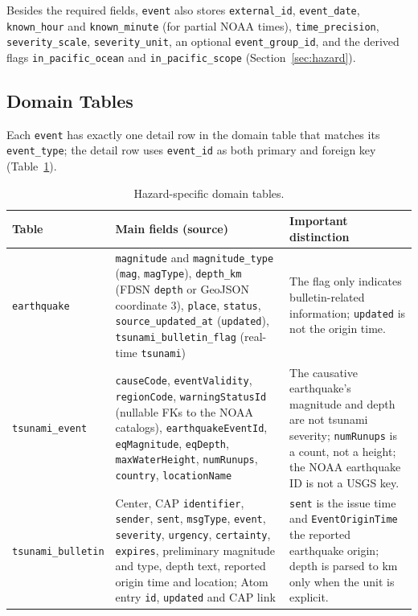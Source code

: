 \documentclass[a4paper,11pt,oneside]{book}
\begin{document}
Besides the required fields, \texttt{event} also stores \texttt{external\_id}, \texttt{event\_date}, \texttt{known\_hour} and \texttt{known\_minute} (for partial NOAA times), \texttt{time\_precision}, \texttt{severity\_scale}, \texttt{severity\_unit}, an optional \texttt{event\_group\_id}, and the derived flags \texttt{in\_pacific\_ocean} and \texttt{in\_pacific\_scope} (Section~\ref{sec:hazard}).

\subsection{Domain Tables}
Each \texttt{event} has exactly one detail row in the domain table that matches its \texttt{event\_type}; the detail row uses \texttt{event\_id} as both primary and foreign key (Table~\ref{tab:domain}).

\begin{table}[H]
\centering
\footnotesize
\begin{tabularx}{\textwidth}{@{}>{\raggedright\arraybackslash}p{2.7cm}>{\raggedright\arraybackslash}X>{\raggedright\arraybackslash}p{4.4cm}@{}}
\toprule
Table & Main fields (source) & Important distinction \\
\midrule
\texttt{earthquake} & \texttt{magnitude} and \texttt{magnitude\_type} (\texttt{mag}, \texttt{magType}), \texttt{depth\_km} (FDSN \texttt{depth} or GeoJSON coordinate 3), \texttt{place}, \texttt{status}, \texttt{source\_updated\_\allowbreak at} (\texttt{updated}), \texttt{tsunami\_bulletin\_\allowbreak flag} (real-time \texttt{tsunami}) & The flag only indicates bulletin-related information; \texttt{updated} is not the origin time. \\
\texttt{tsunami\_event} & \texttt{causeCode}, \texttt{eventValidity}, \texttt{regionCode}, \texttt{warningStatusId} (nullable FKs to the NOAA catalogs), \texttt{earthquakeEventId}, \texttt{eqMagnitude}, \texttt{eqDepth}, \texttt{maxWaterHeight}, \texttt{numRunups}, \texttt{country}, \texttt{locationName} & The causative earthquake's magnitude and depth are not tsunami severity; \texttt{numRunups} is a count, not a height; the NOAA earthquake ID is not a USGS key. \\
\texttt{tsunami\_bulletin} & Center, CAP \texttt{identifier}, \texttt{sender}, \texttt{sent}, \texttt{msgType}, \texttt{event}, \texttt{severity}, \texttt{urgency}, \texttt{certainty}, \texttt{expires}, preliminary magnitude and type, depth text, reported origin time and location; Atom entry \texttt{id}, \texttt{updated} and CAP link & \texttt{sent} is the issue time and \texttt{EventOriginTime} the reported earthquake origin; depth is parsed to km only when the unit is explicit. \\
\bottomrule
\end{tabularx}
\caption{Hazard-specific domain tables.}
\label{tab:domain}
\end{table}
\end{document}
